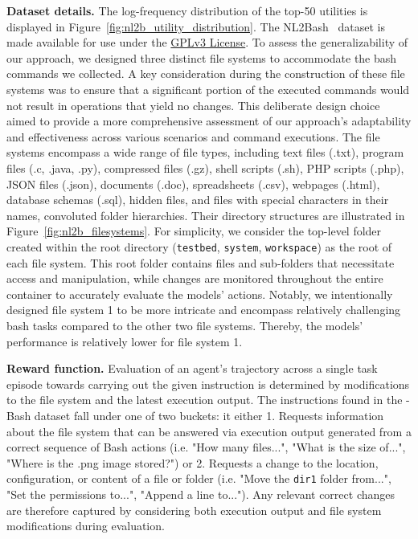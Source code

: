 \textbf{Dataset details.} The log-frequency distribution of the top-50 utilities is displayed in Figure~\ref{fig:nl2b_utility_distribution}.
The NL2Bash~\cite{lin-etal-2018-nl2bash} dataset is made available for use under the \hyperlink{https://www.gnu.org/licenses/gpl-3.0}{GPLv3 License}.
To assess the generalizability of our approach, we designed three distinct file systems to accommodate the bash commands we collected. A key consideration during the construction of these file systems was to ensure that a significant portion of the executed commands would not result in operations that yield no changes. This deliberate design choice aimed to provide a more comprehensive assessment of our approach's adaptability and effectiveness across various scenarios and command executions. The file systems encompass a wide range of file types, including text files (.txt), program files (.c, .java, .py), compressed files (.gz), shell scripts (.sh), PHP scripts (.php), JSON files (.json), documents (.doc), spreadsheets (.csv), webpages (.html), database schemas (.sql), hidden files, and files with special characters in their names, convoluted folder hierarchies. Their directory structures are illustrated in Figure~\ref{fig:nl2b_filesystems}. For simplicity, we consider the top-level folder created within the root directory (\texttt{testbed}, \texttt{system}, \texttt{workspace}) as the root of each file system. This root folder contains files and sub-folders that necessitate access and manipulation, while changes are monitored throughout the entire container to accurately evaluate the models' actions. Notably, we intentionally designed file system 1 to be more intricate and encompass relatively challenging bash tasks compared to the other two file systems. Thereby, the models' performance is relatively lower for file system 1.



\textbf{Reward function.} Evaluation of an agent's trajectory across a single task episode towards carrying out the given instruction is determined by modifications to the file system and the latest execution output. The instructions found in the \benchmark{}-Bash dataset fall under one of two buckets: it either 1. Requests information about the file system that can be answered via execution output generated from a correct sequence of Bash actions (i.e. "How many files...", "What is the size of...", "Where is the .png image stored?") or 2. Requests a change to the location, configuration, or content of a file or folder (i.e. "Move the \texttt{dir1} folder from...", "Set the permissions to...", "Append a line to..."). Any relevant correct changes are therefore captured by considering both execution output and file system modifications during evaluation.

